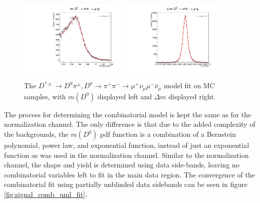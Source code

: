 \begin{figure}[htp]
    \begin{center}
      \includegraphics[width=0.45\textwidth]{figures/chapter4/signal_fit/d0pipimm_2022_2023_0_m.pdf}
      \includegraphics[width=0.45\textwidth]{figures/chapter4/signal_fit/d0pipimm_2022_2023_0_dm.pdf}\\
    \end{center}
    \caption{
      The $D^{*\pm} \to D^0\pi^\pm, D^0 \to \pi^+ \pi^- \to \mu^+ \nu_\mu \mu^- \bar{\nu}_\mu$ model fit on MC samples, with $m(D^0)$ displayed left and $\Delta m$ displayed right.
    }
    \label{fig:d0munumunu_uml_fit}
\end{figure}


The process for determining the combinatorial model is kept the same as for the normalization channel. The only difference is that due to the added complexity of the backgrounds, the $m(D^0)$ pdf function is a combination of a Bernstein polynomial, power law, and exponential function, instead of just an exponential function as was used in the normalization channel. Similar to the normalization channel, the shape and yield is determined using data side-bands, leaving no combinatorial variables left to fit in the main data region. The convergence of the combinatorial fit using partially unblinded data sidebands can be seen in figure \ref{fig:signal_comb_uml_fit}.

